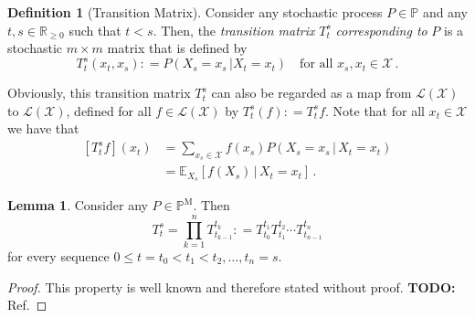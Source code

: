 \documentclass[10pt]{paper}
\theoremstyle{definition}
\newtheorem{proposition}[theorem]{Proposition}
\newtheorem{lemma}[theorem]{Lemma}
\newtheorem{definition}{Definition}
\newcommand{\reals}{\mathbb{R}}
\newcommand{\realsnonneg}{\reals_{\geq 0}}
\newcommand{\states}{\mathcal{X}}
\newcommand{\processes}{\mathbb{P}}
\newcommand{\mprocesses}{\processes^{\mathrm{M}}}
\newcommand{\gambles}{\mathcal{L}}
\newcommand{\gamblesX}{\gambles(\states)}
\newcommand{\coloneqq}{:\!=}
\begin{document}
\begin{definition}[Transition Matrix]\label{def:trans_matrix}
Consider any stochastic process $P\in\processes$ and any $t,s\in\realsnonneg$ such that $t<s$. Then, the \emph{transition matrix} $T_t^s$ \emph{corresponding to} $P$ is a stochastic $m\times m$ matrix that is defined by
\begin{equation*}
T_t^s(x_t, x_s) \coloneqq P(X_s=x_s\,\vert X_t=x_t)\quad\text{for all $x_s,x_t\in\states$}\,.
\end{equation*}
\end{definition}
Obviously, this transition matrix $T_t^s$ can also be regarded as a map from $\gamblesX$ to $\gamblesX$, defined for all $f\in\gamblesX$ by $T_t^s(f)\coloneqq T_t^sf$. Note that for all $x_t\in\states$ we have that
\begin{align*}
\left[T_t^sf\right](x_t) &= \sum_{x_s\in\states}f(x_s)P(X_s=x_s\,\vert\,X_t=x_t)\\
 &= \mathbb{E}_{X_s}\left[f(X_s)\,\vert\,X_t=x_t\right]\,.
\end{align*}


\begin{lemma}\label{lemma:transitionmatrixfactorises}
Consider any $P\in\mprocesses$. Then
\begin{equation*}
T_t^s=\prod_{k=1}^n T_{t_{k-1}}^{t_k} \coloneqq T_{t_0}^{t_1}T_{t_1}^{t_2}\cdots T_{t_{n-1}}^{t_n}
\end{equation*}
for every sequence $0\leq t=t_0<t_1<t_2,\dots,t_{n}=s$.
\end{lemma}
\begin{proof}
This property is well known and therefore stated without proof. {\bf TODO:} Ref.
\end{proof}
\end{document}
